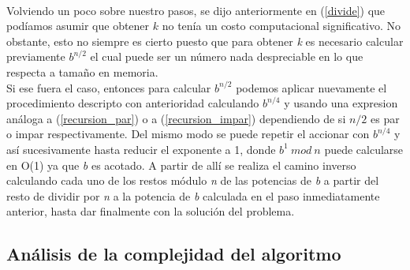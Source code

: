 \paragraph{}
Volviendo un poco sobre nuestro pasos, se dijo anteriormente en (\ref{divide}) que podíamos asumir que obtener $k$ no tenía un costo computacional significativo. No obstante, esto no siempre es cierto puesto que para obtener \textit{k} es necesario calcular previamente $b^{n/2}$ el cual puede ser un número nada despreciable en lo que respecta a tamaño en memoria.\\
Si ese fuera el caso, entonces para calcular $b^{n/2}$ podemos aplicar nuevamente el procedimiento descripto con anterioridad calculando $b^{n/4}$ y usando una expresion análoga a (\ref{recursion_par}) o a (\ref{recursion_impar}) dependiendo de si $n/2$ es par o impar respectivamente. Del mismo modo se puede repetir el accionar con $b^{n/4}$ y así sucesivamente hasta reducir el exponente a 1, donde $b^1\ mod\ n$ puede calcularse en O(1) ya que \textit{b} es acotado. A partir de allí se realiza el camino inverso calculando cada uno de los restos módulo \textit{n} de las potencias de \textit{b} a partir del resto de dividir por \textit{n} a la potencia de \textit{b} calculada en el paso inmediatamente anterior, hasta dar finalmente con la solución del problema.


\subsection{Análisis de la complejidad del algoritmo}

